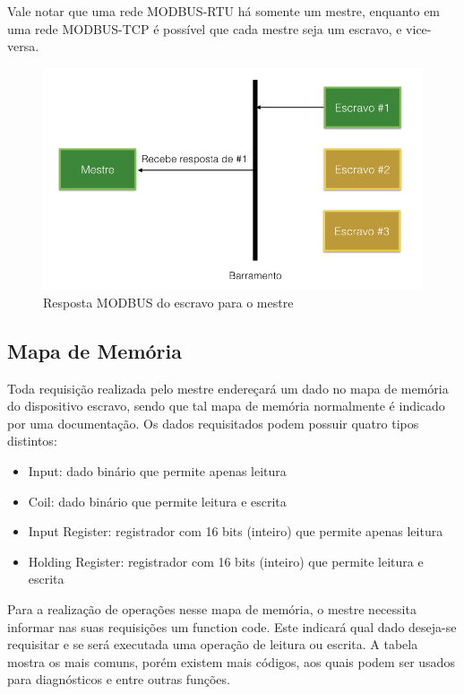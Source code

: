 Vale notar que uma rede MODBUS-RTU há somente um mestre, enquanto em uma rede MODBUS-TCP é possível que cada mestre seja um escravo, e vice-versa.

\begin{figure}[H]
        \begin{center}
                \includegraphics[width=\textwidth,natwidth=1024,natheight=768]{assets/images/modbus-req-2.png}
                \caption{Resposta MODBUS do escravo para o mestre}
                \label{fig:modbus-req-2}
        \end{center}
\end{figure}

\subsection{Mapa de Memória}

Toda requisição realizada pelo mestre endereçará um dado no mapa de memória do dispositivo escravo, sendo que tal mapa de memória normalmente é indicado por uma documentação. Os dados requisitados podem possuir quatro tipos distintos:

\begin{itemize}
  \item Input: dado binário que permite apenas leitura
  \item Coil: dado binário que permite leitura e escrita
  \item Input Register: registrador com 16 bits (inteiro) que permite apenas leitura
  \item Holding Register: registrador com 16 bits (inteiro) que permite leitura e escrita
\end{itemize}

Para a realização de operações nesse mapa de memória, o mestre necessita informar nas suas requisições um function code. Este indicará qual dado deseja-se requisitar e se será executada uma operação de leitura ou escrita. A tabela mostra os mais comuns, porém existem mais códigos, aos quais podem ser usados para diagnósticos e entre outras funções.

